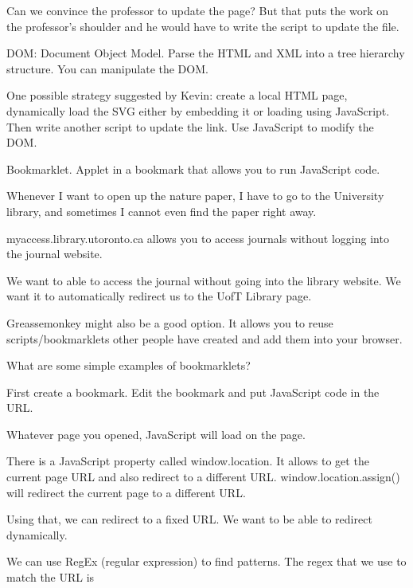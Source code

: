 \documentclass{article}
\begin{document}
Can we convince the professor to update the page? But that puts the work on the professor's shoulder and he would have to write the script to update the file.

DOM: Document Object Model. Parse the HTML and XML into a tree hierarchy structure. You can manipulate the DOM.

One possible strategy suggested by Kevin: create a local HTML page, dynamically load the SVG either by embedding it or loading using JavaScript. Then write another script to update the link. Use JavaScript to modify the DOM. 

Bookmarklet. Applet in a bookmark that allows you to run JavaScript code.

Whenever I want to open up the nature paper, I have to go to the University library, and sometimes I cannot even find the paper right away.

myaccess.library.utoronto.ca allows you to access journals without logging into the journal website.

We want to able to access the journal without going into the library website. We want it to automatically redirect us to the UofT Library page.

Greassemonkey might also be a good option. It allows you to reuse scripts/bookmarklets other people have created and add them into your browser.

What are some simple examples of bookmarklets?

First create a bookmark. Edit the bookmark and put JavaScript code in the URL.

Whatever page you opened, JavaScript will load on the page.

There is a JavaScript property called window.location. It allows to get the current page URL and also redirect to a different URL. window.location.assign() will redirect the current page to a different URL.

Using that, we can redirect to a fixed URL. We want to be able to redirect dynamically.

We can use RegEx (regular expression) to find patterns. The regex that we use to match the URL is
\end{document}
